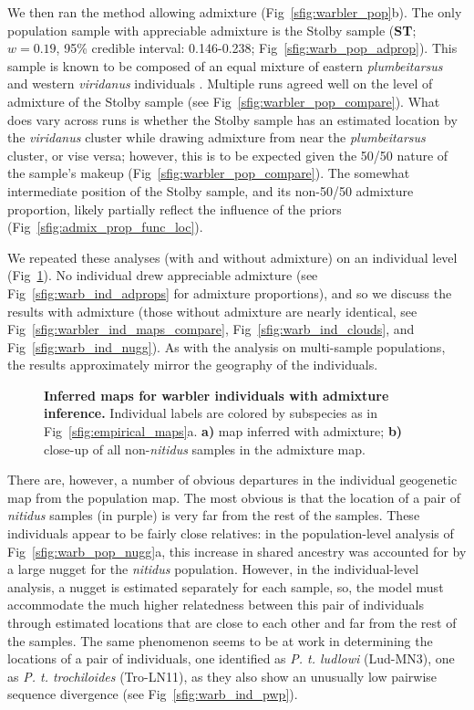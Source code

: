 \documentclass[10pt,letterpaper]{article}
\begin{document}
We then ran the method allowing admixture (Fig\ \ref{sfig:warbler_pop}b). The only population sample with appreciable admixture is the Stolby sample (\textbf{ST}; $w=0.19$, 95\% credible interval: 0.146-0.238; Fig\ \ref{sfig:warb_pop_adprop}).  This sample is known to be composed of an equal mixture of eastern \textit{plumbeitarsus} and western \textit{viridanus} individuals \cite{alcaide2014genomic}. Multiple runs agreed well on the level of admixture of the Stolby sample (see Fig\ \ref{sfig:warbler_pop_compare}). What does vary across runs is whether the Stolby sample has an estimated location by the \textit{viridanus} cluster while drawing admixture from near the \textit{plumbeitarsus} cluster, or vise versa; however, this is to be expected given the 50/50 nature of the sample's makeup (Fig\ \ref{sfig:warbler_pop_compare}). The somewhat intermediate position of the Stolby sample, and its non-50/50 admixture proportion, likely partially reflect the influence of the priors (Fig\ \ref{sfig:admix_prop_func_loc}). 

We repeated these analyses (with and without admixture) on an individual level (Fig\ \ref{sfig:warbler_ind_maps}).  
No individual drew appreciable admixture (see Fig\ \ref{sfig:warb_ind_adprops} for admixture proportions), and so we discuss the results with admixture (those without admixture are nearly identical, see Fig\ \ref{sfig:warbler_ind_maps_compare}, Fig\ \ref{sfig:warb_ind_clouds}, and Fig\ \ref{sfig:warb_ind_nugg}).  As with the analysis on multi-sample populations, the results approximately mirror the geography of the individuals.
%
\begin{figure}[ht!]
\begin{center}
\end{center}
\caption{
\textbf{Inferred maps for warbler individuals with admixture inference.}
Individual labels are colored by subspecies as in Fig\ \ref{sfig:empirical_maps}a.   
	\textbf{a)}
	map inferred with admixture; 
	\textbf{b)} close-up of all non-\textit{nitidus} samples in the admixture map.
}\label{sfig:warbler_ind_maps}
\end{figure}

There are, however, a number of obvious departures in the individual geogenetic map from the population map.  The most obvious is that the location of a pair of \textit{nitidus} samples (in purple) is very far from the rest of the samples.  
These individuals appear to be fairly close relatives:
in the population-level analysis of Fig\ \ref{sfig:warb_pop_nugg}a,
this increase in shared ancestry was accounted for by a large nugget for the \textit{nitidus} population.
However, in the individual-level analysis, a nugget is estimated separately for each sample, 
so, the model must accommodate the much higher relatedness between this pair of individuals
through estimated locations that are close to each other and far from the rest of the samples.
The same phenomenon seems to be at work in determining the locations of a pair of individuals, one identified as \textit{P. t. ludlowi} (Lud-MN3), one as \textit{P. t. trochiloides} (Tro-LN11), 
as they also show an unusually low pairwise sequence divergence (see Fig\ \ref{sfig:warb_ind_pwp}).
\end{document}
